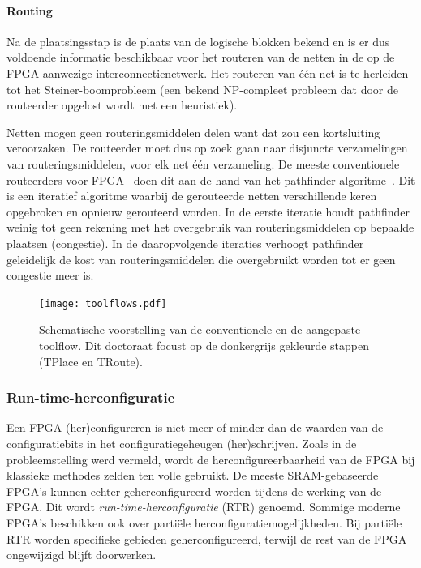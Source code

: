 \documentclass[a4paper,oneside,12pt]{article}
\begin{document}
\paragraph{Routing} Na de plaatsingsstap is de plaats van de logische blokken bekend en is er dus voldoende informatie beschikbaar voor het routeren van de netten in de op de FPGA aanwezige interconnectienetwerk. Het routeren van \'e\'en net is te herleiden tot het Steiner-boomprobleem (een bekend NP-compleet probleem dat door de routeerder opgelost wordt met een heuristiek).

Netten mogen geen routeringsmiddelen delen want dat zou een kortsluiting veroorzaken. De routeerder moet dus op zoek gaan naar disjuncte verzamelingen van routeringsmiddelen, voor elk net \'e\'en verzameling. De meeste conventionele routeerders voor FPGA~\cite{vprBVRJ, vprboek} doen dit aan de hand van het pathfinder-algoritme~\cite{pathfinder}. Dit is een iteratief algoritme waarbij de gerouteerde netten verschillende keren opgebroken en opnieuw gerouteerd worden. In de eerste iteratie houdt pathfinder weinig tot geen rekening met het overgebruik van routeringsmiddelen op bepaalde plaatsen (congestie). In de daaropvolgende iteraties verhoogt pathfinder geleidelijk de kost van routeringsmiddelen die overgebruikt worden tot er geen congestie meer is.

\begin{figure}[ht]
\centering
\texttt{[image: toolflows.pdf]}
\caption{Schematische voorstelling van de conventionele en de aangepaste toolflow. Dit doctoraat focust op de donkergrijs gekleurde stappen (TPlace en TRoute).}
\label{toolflows}
\end{figure}

\subsubsection{Run-time-herconfiguratie}\label{rtr}
Een FPGA (her)configureren is niet meer of minder dan de waarden van de configuratiebits in het configuratiegeheugen (her)schrijven. Zoals in de probleemstelling werd vermeld, wordt de herconfigureerbaarheid van de FPGA bij klassieke methodes zelden ten volle gebruikt. %
De meeste SRAM-gebaseerde FPGA's kunnen echter geherconfigureerd worden tijdens de werking van de FPGA. Dit wordt {\em run-time-herconfiguratie} (RTR) genoemd. Sommige moderne FPGA's \cite{XilinxRTRFlow1,XilinxRTRFlow2} beschikken ook over parti\"ele herconfiguratiemogelijkheden. Bij parti\"ele RTR worden specifieke gebieden geherconfigureerd, terwijl de rest van de FPGA ongewijzigd blijft doorwerken. 
\end{document}
